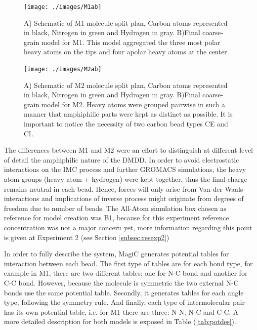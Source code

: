 \documentclass[10pt,a4paper,twoside]{article}
\begin{document}
 \begin{figure}[ht]
 \centering
	\texttt{[image: ./images/M1ab]}
	\caption{A) Schematic of M1 molecule split plan, Carbon atoms represented in black, Nitrogen in green and Hydrogen in gray. B)Final coarse-grain model for M1. This model aggregated the three most polar heavy atoms on the tips and four apolar heavy atoms at the center.}
	\label{Fig:mol1}
\end{figure}
 \begin{figure}[ht]
 \centering
	\texttt{[image: ./images/M2ab]}
	\caption{A) Schematic of M2 molecule split plan, Carbon atoms represented in black, Nitrogen in green and Hydrogen in gray. B)Final coarse-grain model for M2. Heavy atoms were grouped pairwise in such a manner that amphiphilic parts were kept as distinct as possible. It is important to notice the necessity of two carbon bead types CE and CI.}
		\label{Fig:mol2}
\end{figure}
 
 The differences between M1 and M2 were an effort to distinguish at different level of detail the amphiphilic nature of the DMDD. In order to avoid electrostatic interactions on the IMC process and further GROMACS simulations, the heavy atom groups (heavy atom + hydrogen) were kept together, thus the final charge remains neutral in each bead. Hence, forces will only arise from Van der Waals interactions and implications of inverse process might originate from  degrees of freedom due to number of beads. The All-Atom simulation box chosen as reference for model creation was B1, because for this experiment reference concentration was not a major concern yet, more information regarding this point is given at Experiment 2 (see Section \ref{subsec:resexp2})
   
 In order to fully describe the system, MagiC generates potential tables for interaction between each bead. The first type of tables are for each bond type, for example in M1, there are two different tables: one for N-C bond and another for C-C bond. However, because the molecule is symmetric the two external N-C bonds use the same potential table. Secondly, it generates tables for each angle type, following the symmetry rule. And finally, each type of intermolecular pair has its own potential table, i.e. for M1 there are three: N-N, N-C and C-C. A more detailed description for both models is exposed in Table (\ref{tab:potdes}).
  
\end{document}
